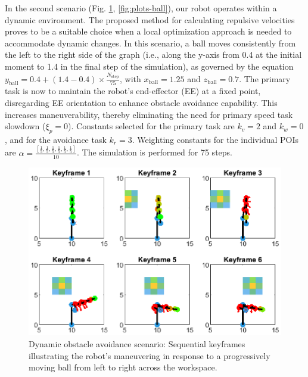 \documentclass[letterpaper, 10 pt, conference]{ieeeconf}  %
\begin{document}
In the second scenario (Fig. \ref{fig:keyframes-3d-ball}, \ref{fig:plots-ball}), our robot operates within a dynamic environment. The proposed method for calculating repulsive velocities proves to be a suitable choice when a local optimization approach is needed to accommodate dynamic changes. In this scenario, a ball moves consistently from the left to the right side of the graph (i.e., along the y-axis from 0.4 at the initial moment to 1.4 in the final step of the simulation), as governed by the equation \( y_{\text{ball}} = 0.4 + (1.4 - 0.4) \times \frac{N_{\text{step}}}{75} \),  with \( x_{\text{ball}} = 1.25 \) and \( z_{\text{ball}} = 0.7 \). The primary task is now to maintain the robot's end-effector (EE) at a fixed point, disregarding EE orientation to enhance obstacle avoidance capability. This increases maneuverability, thereby eliminating the need for primary speed task slowdown (\( \xi_{p} = 0 \)). Constants selected for the primary task are \( k_v = 2 \) and \( k_w = 0 \), and for the avoidance task \( k_r = 3 \). Weighting constants for the individual POIs are \( \alpha = \frac{[ \frac{1}{5}, \frac{1}{5}, \frac{1}{5}, \frac{1}{5}, \frac{1}{5}, \frac{1}{5} ]}{10} \). The simulation is performed for 75 steps. 

\begin{figure}
	\centering
	\includegraphics[width=1\linewidth]{keyframes_2D_ball.eps} %
	\caption{Dynamic obstacle avoidance scenario: Sequential keyframes illustrating the robot’s maneuvering in response to a progressively moving ball from left to right across the workspace.}
	\label{fig:keyframes-3d-ball}
\end{figure}
\end{document}
